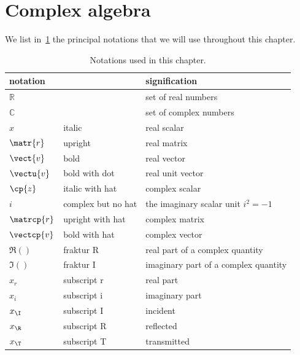 \FloatBarrier


\section{Complex algebra}
We list in~\cref{tab:notations} the principal notations that we will use throughout this chapter.

\begin{table}[hbtp]
    \centering
    \begin{tabular}{lll}
        \toprule
        notation     & & signification \\
        \midrule
        $\mathbb{R}$ &                    & set of real numbers\\
        $\mathbb{C}$ &                    & set of complex numbers\\        
        $x$          & italic             & real scalar\\
        $\matr{r}$   & upright            & real matrix\\
        $\vect{v}$   & bold               & real vector\\
        $\vectu{v}$  & bold with dot      & real unit vector\\
        $\cp{z}$     & italic with hat    & complex scalar\\
        $i$          & complex but no hat & the imaginary scalar unit $i^2=-1$\\
        $\matrcp{r}$ & upright with hat   & complex matrix \\
        $\vectcp{v}$ & bold with hat      & complex vector \\
        $\Re()$      & fraktur R          & real part of a complex quantity \\
        $\Im()$      & fraktur I          & imaginary part of a complex quantity \\
        $x_r$        & subscript r        & real part \\
        $x_i$        & subscript i        & imaginary part \\
        $x_\I$       & subscript I        & incident \\
        $x_\R$       & subscript R        & reflected \\
        $x_\T$       & subscript T        & transmitted \\
        \bottomrule        
    \end{tabular}
    \caption{Notations used in this chapter.}
    \label{tab:notations}
\end{table}

